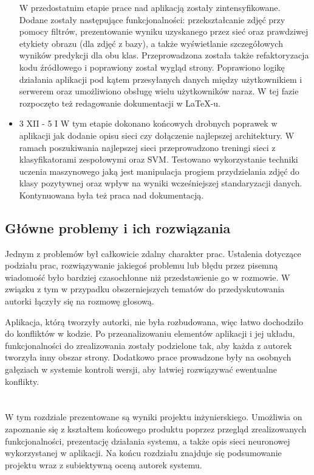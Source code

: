 \documentclass[polish,12pt]{aghthesis}
\begin{document}
\begin{itemize}
W przedostatnim etapie prace nad aplikacją zostały zintensyfikowane. Dodane zostały następujące funkcjonalności: przekształcanie zdjęć przy pomocy filtrów, prezentowanie wyniku uzyskanego przez sieć oraz prawdziwej etykiety obrazu (dla zdjęć z bazy), a także wyświetlanie szczegółowych wyników predykcji dla obu klas. Przeprowadzona została także refaktoryzacja kodu źródłowego i poprawiony został wygląd strony. Poprawiono logikę działania aplikacji pod kątem przesyłanych danych między użytkownikiem i serwerem oraz umożliwiono obsługę wielu użytkowników naraz. W tej fazie rozpoczęto też redagowanie dokumentacji w LaTeX-u.
  \item 3 XII - 5 I \newline
W tym etapie dokonano końcowych drobnych poprawek w aplikacji jak dodanie opisu sieci czy dołączenie najlepszej architektury. W ramach poszukiwania najlepszej sieci przeprowadzono treningi sieci z klasyfikatorami zespołowymi oraz SVM. Testowano wykorzystanie techniki uczenia maszynowego jaką jest manipulacja progiem przydzielania zdjęć do klasy pozytywnej oraz wpływ na wyniki wcześniejszej standaryzacji danych. Kontynuowana była też praca nad dokumentacją.
\end{itemize}

\subsection{Główne problemy i ich rozwiązania}
Jednym z problemów był całkowicie zdalny charakter prac. Ustalenia dotyczące podziału prac, rozwiązywanie jakiegoś problemu lub błędu przez pisemną wiadomość było bardziej czasochłonne niż przedstawienie go w rozmowie. W związku z tym w przypadku obszerniejszych tematów do przedyskutowania autorki łączyły się na rozmowę głosową. 

Aplikacja, którą tworzyły autorki, nie była rozbudowana, więc łatwo dochodziło do konfliktów w kodzie. Po przeanalizowaniu elementów aplikacji i jej układu, funkcjonalności do zrealizowania zostały podzielone tak, aby każda z autorek tworzyła inny obszar strony. Dodatkowo prace prowadzone były na osobnych gałęziach w systemie kontroli wersji, aby łatwiej rozwiązywać ewentualne konflikty.

\newpage
\section{\SectionTitleResults}
\label{sec:wyniki-projektu}
\par W tym rozdziale prezentowane są wyniki projektu inżynierskiego. Umożliwia on zapoznanie się z kształtem końcowego produktu poprzez przegląd zrealizowanych funkcjonalności, prezentację działania systemu, a także opis sieci neuronowej wykorzystanej w aplikacji. Na końcu rozdziału znajduje się podsumowanie projektu wraz z subiektywną oceną autorek systemu.
\end{document}

